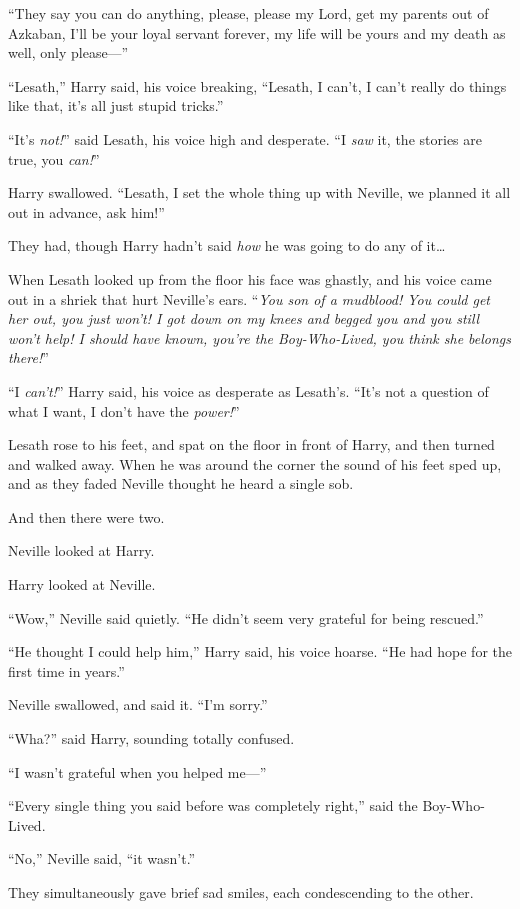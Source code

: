 “They say you can do anything, please, please my Lord, get my parents out of
Azkaban, I’ll be your loyal servant forever, my life will be yours and my death
as well, only please—”

“Lesath,” Harry said, his voice breaking, “Lesath, I can’t, I can’t really do
things like that, it’s all just stupid tricks.”

“It’s \emph{not!}” said Lesath, his voice high and desperate. “I \emph{saw} it,
the stories are true, you \emph{can!}”

Harry swallowed. “Lesath, I set the whole thing up with Neville, we planned it
all out in advance, ask him!”

They had, though Harry hadn’t said \emph{how} he was going to do any of
it…

When Lesath looked up from the floor his face was ghastly, and his voice came
out in a shriek that hurt Neville’s ears. “\emph{You son of a mudblood! You
could get her out, you just won’t! I got down on my knees and begged you and
you still won’t help! I should have known, you’re the Boy-Who-Lived, you think
she belongs there!}”

“I \emph{can’t!}” Harry said, his voice as desperate as Lesath’s. “It’s not a
question of what I want, I don’t have the \emph{power!}”

Lesath rose to his feet, and spat on the floor in front of Harry, and then
turned and walked away. When he was around the corner the sound of his feet
sped up, and as they faded Neville thought he heard a single sob.

And then there were two.

Neville looked at Harry.

Harry looked at Neville.

“Wow,” Neville said quietly. “He didn’t seem very grateful for being rescued.”

“He thought I could help him,” Harry said, his voice hoarse. “He had hope for
the first time in years.”

Neville swallowed, and said it. “I’m sorry.”

“Wha?” said Harry, sounding totally confused.

“I wasn’t grateful when you helped me—”

“Every single thing you said before was completely right,” said the
Boy-Who-Lived.

“No,” Neville said, “it wasn’t.”

They simultaneously gave brief sad smiles, each condescending to the other.

